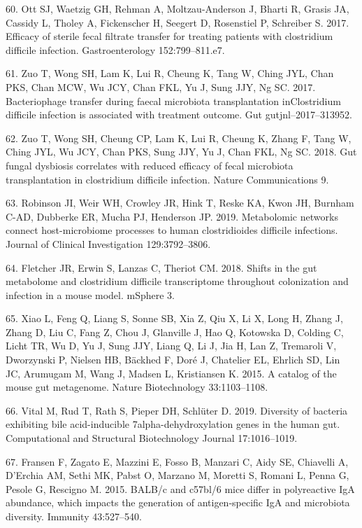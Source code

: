 \documentclass[11pt,]{article}
\begin{document}
\hypertarget{ref-Ott2017}{}
60. Ott SJ, Waetzig GH, Rehman A, Moltzau-Anderson J, Bharti R, Grasis
JA, Cassidy L, Tholey A, Fickenscher H, Seegert D, Rosenstiel P,
Schreiber S. 2017. Efficacy of sterile fecal filtrate transfer for
treating patients with clostridium difficile infection. Gastroenterology
152:799--811.e7.

\hypertarget{ref-Zuo2017}{}
61. Zuo T, Wong SH, Lam K, Lui R, Cheung K, Tang W, Ching JYL, Chan PKS,
Chan MCW, Wu JCY, Chan FKL, Yu J, Sung JJY, Ng SC. 2017. Bacteriophage
transfer during faecal microbiota transplantation inClostridium
difficile infection is associated with treatment outcome. Gut
gutjnl--2017--313952.

\hypertarget{ref-Zuo2018}{}
62. Zuo T, Wong SH, Cheung CP, Lam K, Lui R, Cheung K, Zhang F, Tang W,
Ching JYL, Wu JCY, Chan PKS, Sung JJY, Yu J, Chan FKL, Ng SC. 2018. Gut
fungal dysbiosis correlates with reduced efficacy of fecal microbiota
transplantation in clostridium difficile infection. Nature
Communications 9.

\hypertarget{ref-Robinson2019}{}
63. Robinson JI, Weir WH, Crowley JR, Hink T, Reske KA, Kwon JH, Burnham
C-AD, Dubberke ER, Mucha PJ, Henderson JP. 2019. Metabolomic networks
connect host-microbiome processes to human clostridioides difficile
infections. Journal of Clinical Investigation 129:3792--3806.

\hypertarget{ref-Fletcher2018}{}
64. Fletcher JR, Erwin S, Lanzas C, Theriot CM. 2018. Shifts in the gut
metabolome and clostridium difficile transcriptome throughout
colonization and infection in a mouse model. mSphere 3.

\hypertarget{ref-Xiao2015}{}
65. Xiao L, Feng Q, Liang S, Sonne SB, Xia Z, Qiu X, Li X, Long H, Zhang
J, Zhang D, Liu C, Fang Z, Chou J, Glanville J, Hao Q, Kotowska D,
Colding C, Licht TR, Wu D, Yu J, Sung JJY, Liang Q, Li J, Jia H, Lan Z,
Tremaroli V, Dworzynski P, Nielsen HB, Bäckhed F, Doré J, Chatelier EL,
Ehrlich SD, Lin JC, Arumugam M, Wang J, Madsen L, Kristiansen K. 2015. A
catalog of the mouse gut metagenome. Nature Biotechnology 33:1103--1108.

\hypertarget{ref-Vital2019}{}
66. Vital M, Rud T, Rath S, Pieper DH, Schlüter D. 2019. Diversity of
bacteria exhibiting bile acid-inducible 7alpha-dehydroxylation genes in
the human gut. Computational and Structural Biotechnology Journal
17:1016--1019.

\hypertarget{ref-Fransen2015}{}
67. Fransen F, Zagato E, Mazzini E, Fosso B, Manzari C, Aidy SE,
Chiavelli A, D'Erchia AM, Sethi MK, Pabst O, Marzano M, Moretti S,
Romani L, Penna G, Pesole G, Rescigno M. 2015. BALB/c and c57bl/6 mice
differ in polyreactive IgA abundance, which impacts the generation of
antigen-specific IgA and microbiota diversity. Immunity 43:527--540.
\end{document}
